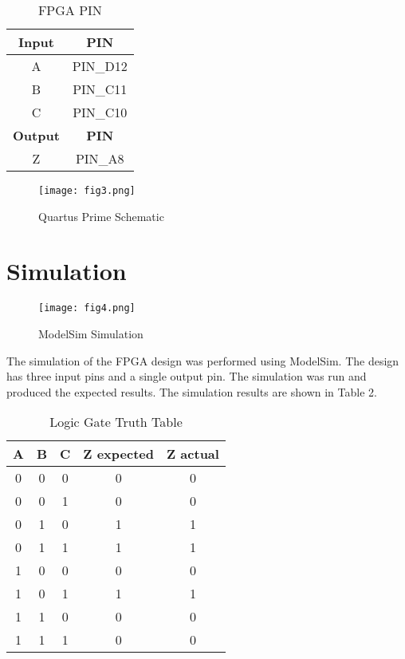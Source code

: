 \documentclass[11pt]{article}
\begin{document}
\begin{table}[H]
    \centering
    \caption{FPGA PIN}
    \begin{tabular}{|c|c|}
    \hline
    \textbf{Input} & \textbf{PIN} \\
    \hline
    A & PIN\_D12 \\
    B & PIN\_C11 \\
    C & PIN\_C10 \\
    \hline
    \textbf{Output} & \textbf{PIN} \\
    \hline
    Z & PIN\_A8 \\
    \hline
    \end{tabular}
\end{table}

\begin{figure}[H]
  \centering
  \texttt{[image: fig3.png]}
  \caption{Quartus Prime Schematic}
  \label{fig:4}
\end{figure}

\section*{\textcolor{mycolor}{Simulation}}
\begin{figure}[H]
  \centering
  \texttt{[image: fig4.png]}
  \caption{ModelSim Simulation}
  \label{fig:4}
\end{figure}
The simulation of the FPGA design was performed using ModelSim. The design has three input pins and a single output pin. The simulation was run and produced the expected results. The simulation results are shown in Table 2.

\begin{table}[h]
\centering
\caption{Logic Gate Truth Table}
\begin{tabular}{|c|c|c|c|c|}
\hline
\textbf{A} & \textbf{B} & \textbf{C} & \textbf{Z expected} & \textbf{Z actual} \\
\hline
0 & 0 & 0 & 0 & 0 \\
0 & 0 & 1 & 0 & 0 \\
0 & 1 & 0 & 1 & 1 \\
0 & 1 & 1 & 1 & 1 \\
1 & 0 & 0 & 0 & 0 \\
1 & 0 & 1 & 1 & 1 \\
1 & 1 & 0 & 0 & 0 \\
1 & 1 & 1 & 0 & 0 \\
\hline
\end{tabular}
\end{table}
\end{document}
